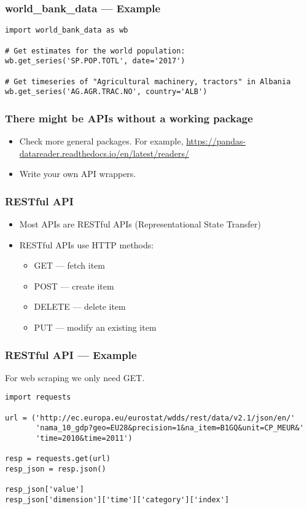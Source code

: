 \begin{frame}[fragile]
    \frametitle{world\_bank\_data --- Example}
\begin{verbatim}
import world_bank_data as wb

# Get estimates for the world population:
wb.get_series('SP.POP.TOTL', date='2017')

# Get timeseries of "Agricultural machinery, tractors" in Albania
wb.get_series('AG.AGR.TRAC.NO', country='ALB')
\end{verbatim}
\end{frame}

\begin{frame}
    \frametitle{There might be APIs without a working package}
    \begin{itemize}
        \item Check more general packages. For example, \url{https://pandas-datareader.readthedocs.io/en/latest/readers/}
        \item Write your own API wrappers.
    \end{itemize}
\end{frame}

\begin{frame}
    \frametitle{RESTful API}
    \begin{itemize}
        \item Most APIs are RESTful APIs (Representational State Transfer)
        \item RESTful APIs use HTTP methods:
        \begin{itemize}
            \item GET --- fetch item
            \item POST --- create item
            \item DELETE --- delete item
            \item PUT --- modify an existing item
        \end{itemize}
    \end{itemize}
\end{frame}

\begin{frame}[fragile]
    \frametitle{RESTful API --- Example}

    For web scraping we only need GET.

\begin{verbatim}
import requests

url = ('http://ec.europa.eu/eurostat/wdds/rest/data/v2.1/json/en/'
       'nama_10_gdp?geo=EU28&precision=1&na_item=B1GQ&unit=CP_MEUR&'
       'time=2010&time=2011')

resp = requests.get(url)
resp_json = resp.json()

resp_json['value']
resp_json['dimension']['time']['category']['index']
\end{verbatim}
\end{frame}